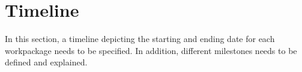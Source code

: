 \chapter{Timeline}
In this section, a timeline depicting the starting and ending date for each workpackage needs to be specified.
In addition, different milestones needs to be defined and explained.




